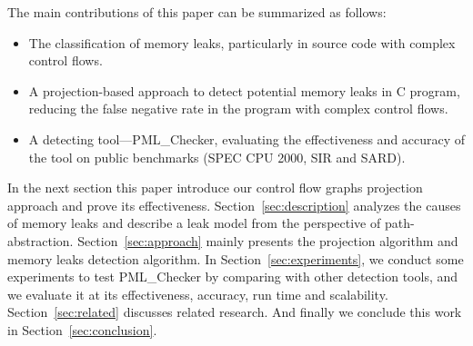 The main contributions of this paper can be summarized as follows:
\begin{itemize}
\item The classification of memory leaks, particularly in source code with complex control flows.
\item A projection-based approach to detect potential memory leaks in C program, reducing the false negative rate in the program with complex control flows.
\item A detecting tool---PML\_Checker, evaluating the effectiveness and accuracy of the tool on public benchmarks (SPEC CPU 2000, SIR and SARD). 
\end{itemize}

In the next section this paper introduce our control flow graphs projection approach and prove its effectiveness. Section~\ref{sec:description} analyzes the causes of memory leaks and describe a leak model from the perspective of path-abstraction. Section~\ref{sec:approach} mainly presents the projection algorithm and memory leaks detection algorithm. In Section~\ref{sec:experiments}, we conduct some experiments to test PML\_Checker by comparing with other detection tools, and we evaluate it at its effectiveness, accuracy, run time and scalability. Section~\ref{sec:related} discusses related research. And finally we conclude this work in Section~\ref{sec:conclusion}.
